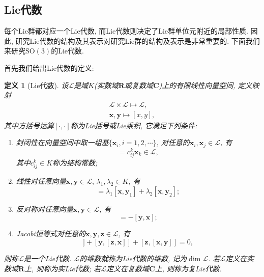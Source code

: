 \documentclass[UTF8]{ctexart}
\newtheorem{define}{定义}
\begin{document}
\subsection{Lie代数}
每个Lie群都对应一个Lie代数, 而Lie代数则决定了Lie群单位元附近的局部性质. 因此, 研究Lie代数的结构及其表示对研究Lie群的结构及表示是非常重要的. 下面我们来研究$\mathrm{SO}(3)$的Lie代数.

首先我们给出Lie代数的定义:
\begin{define}[Lie代数]
  设$\mathcal{L}$是域$K$(实数域$\mathbf{R}$或复数域$\mathbf{C}$)上的有限线性向量空间, 定义映射
  \begin{gather}
    \mathcal{L} \times \mathcal{L} \mapsto \mathcal{L}, \\
    \bm{x}, \bm{y} \mapsto [x,y],
  \end{gather}
其中方括号运算$[\cdot,\cdot]$称为Lie括号或Lie乘积, 它满足下列条件:
\begin{enumerate}
\item 封闭性\quad 在向量空间中取一组基$\{\bm{x}_i, i = 1, 2, \cdots\}$, 对任意的$\bm{x}_i, \bm{x}_j \in \mathcal{L}$, 有
  \begin{equation}
    [\bm{x}_i, \bm{x}_j] = c_{ij}^{k}\bm{x}_k \in \mathcal{L},
  \end{equation}
其中$c_{ij}^k \in K$称为结构常数;
\item 线性\quad 对任意向量$\bm{x},\bm{y} \in \mathcal{L}, \, \lambda_1, \lambda_2 \in K$, 有
  \begin{equation}
    [\bm{x}, \lambda_1\bm{y}_1 + \lambda_1\bm{y}_2] = \lambda_1[\bm{x},\bm{y}_1] + \lambda_2[\bm{x}, \bm{y}_2];
  \end{equation}
\item 反对称\quad 对任意向量$\bm{x},\bm{y} \in \mathcal{L}$, 有
  \begin{equation}
    [\bm{x}, \bm{y}] = -[\bm{y}, \bm{x}];
  \end{equation}
\item Jacobi恒等式\quad 对任意的$\bm{x}, \bm{y}, \bm{z} \in \mathcal{L}$, 有
  \begin{equation}
    [\bm{x},[\bm{y},\bm{z}]] + [\bm{y},[\bm{z},\bm{x}]] + [\bm{z},[\bm{x},\bm{y}]]  = 0,
  \end{equation}
\end{enumerate}
则称$\mathcal{L}$是一个Lie代数. $\mathcal{L}$的维数就称为Lie代数的维数, 记为$\dim \mathcal{L}$. 若$\mathcal{L}$定义在实数域$\mathbf{R}$上, 则称为实Lie代数; 若$\mathcal{L}$定义在复数域$\mathbf{C}$上, 则称为复Lie代数.
\end{define}
\end{document}
